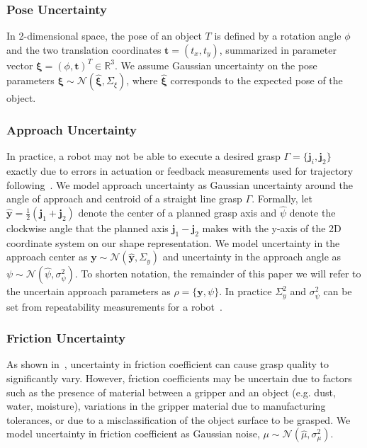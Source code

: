 \documentclass[10pt, conference]{ieeeconf}      %
\newcommand{\bj}{\mathbf{j}}
\newcommand{\bt}{\mathbf{t}}
\newcommand{\by}{\mathbf{y}}
\newcommand{\mN}{\mathcal{N}}
\begin{document}
\subsubsection{Pose Uncertainty}
In 2-dimensional space, the pose of an object $T$ is defined by a rotation angle $\phi$ and the two translation coordinates $\bt = (t_x, t_y)$, summarized in parameter vector $\mathbf{\xi} = (\phi, \bt)^T \in \mathbb{R}^3$.  We assume Gaussian uncertainty on the pose parameters $\mathbf{\xi} \sim \mN \left( \hat{\mathbf{\xi}}, \Sigma_{\xi} \right)$, where $\hat{\mathbf{\xi}}$ corresponds to the expected pose of the object. 

 
 \subsubsection{Approach Uncertainty}
In practice, a robot may not be able to execute a desired grasp $\Gamma = \lbrace \bj_i,\bj_2\rbrace$ exactly due to errors in actuation or feedback measurements used for trajectory following~\cite{kehoe2012estimating}.
We model approach uncertainty as Gaussian uncertainty around the angle of approach and centroid of a straight line grasp $\Gamma$.
Formally, let $\hat{\by} = \frac{1}{2} (\bj_1 + \bj_2)$ denote the center of a planned grasp axis and $\hat{\psi}$ denote the clockwise angle that the planned axis $\bj_1 - \bj_2$ makes with the y-axis of the 2D coordinate system on our shape representation.
We model uncertainty in the approach center as $\by \sim \mN(\hat{\by}, \Sigma_y)$ and uncertainty in the approach angle as $\psi \sim \mN(\hat{\psi}, \sigma_{\psi}^2)$.
To shorten notation, the remainder of this paper we will refer to the uncertain approach parameters as $\rho = \{\by, \psi \}$.
In practice $\Sigma_{y}^2$ and $\sigma_{\psi}^2$ can be set from repeatability measurements for a robot~\cite{mooring1986determination}.

 \subsubsection{Friction Uncertainty}
As shown in~\cite{hang2013a,zheng2005}, uncertainty in friction coefficient can cause grasp quality to significantly vary.
However, friction coefficients may be uncertain due to factors such as the presence of material between a gripper and an
object (e.g. dust, water, moisture), variations in the gripper material due to manufacturing tolerances, or due to a misclassification of the object surface to be grasped. We model uncertainty in friction coefficient as Gaussian noise, $\mu \sim \mN(\hat{\mu},\sigma_{\mu}^2)$.
\end{document}
